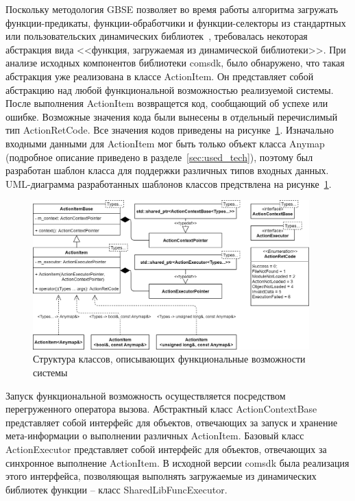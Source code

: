 Поскольку методология GBSE позволяет во время работы алгоритма загружать функции-предикаты, функции-обработчики и функции-селекторы из стандартных или пользовательских динамических библиотек~\cite{SokolovPershin2018}, требовалась некоторая абстракция вида <<функция, загружаемая из динамической библиотеки>>. При анализе исходных компонентов библиотеки comsdk, было обнаружено, что такая абстракция уже реализована в классе \textsf{ActionItem}. Он представляет собой абстракцию над любой функциональной возможностью реализуемой системы. После выполнения \textsf{ActionItem} возвращется код, сообщающий об успехе или ошибке. Возможные значения кода были вынесены в отдельный перечислимый тип \textsf{ActionRetCode}. Все значения кодов приведены на рисунке~\ref{fig:UMLActionItems}. Изначально входными данными для \textsf{ActionItem} мог быть только объект класса \textsf{Anymap} (подробное описание приведено в разделе~\ref{sec:used_tech}), поэтому был разработан шаблон класса для поддержки различных типов входных данных. UML-диаграмма разработанных шаблонов классов предствлена на рисунке~\ref{fig:UMLActionItems}.
\begin{figure}[!ht]
    \centering
    \includegraphics[width=0.95\textwidth]{figures/UML.actionItem.png}
    \caption{Структура классов, описывающих функциональные возможности системы}
    \label{fig:UMLActionItems}
\end{figure}

Запуск функциональной возможность осуществляется посредством перегруженного оператора вызова. Абстрактный класс \textsf{ActionContextBase} представляет собой интерфейс для объектов, отвечающих за запуск и хранение мета-информации о выполнении различных \textsf{ActionItem}. Базовый класс \textsf{ActionExecutor} представляет собой интерфейс для объектов, отвечающих за синхронное выполнение \textsf{ActionItem}. В исходной версии comsdk была реализация этого интерфейса, позволяющая выполнять загружаемые из динамических библиотек функции -- класс \textsf{SharedLibFuncExecutor}.

